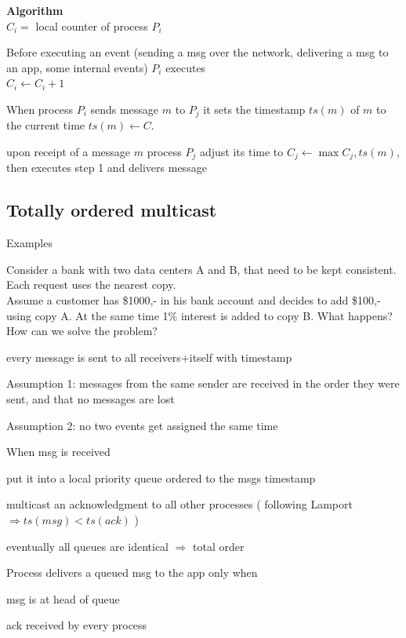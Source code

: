 \documentclass[ngerman,a4paper]{report}
\begin{document}
\textbf{Algorithm} \\
 $C_i =$ local counter of process $P_i$
 
\begin{compactenum}
\item Before executing an event (sending a msg over the network, delivering a msg to an app, some internal events) $P_i$ executes\\
$C_i \leftarrow C_i + 1$
\item When process $P_i$ sends message $m$ to $P_j$ it sets the timestamp $ts(m)$ of $m$ to the current time $ts(m) \leftarrow C$.
\item upon receipt of a message $m$ process $P_j$ adjust its time to $C_j \leftarrow \max{C_j, ts(m)}$, then executes step 1 and delivers message
\end{compactenum}

\subsection{Totally ordered multicast}
Examples
\begin{compactitem}
\item Consider a bank with two data centers A and B, that need to be kept consistent. Each request uses the nearest copy. \\
Assume a customer has \$1000,- in his bank account and decides to add \$100,- using copy A. At the same time 1\% interest is added to copy B. What happens? How can we solve the problem?



\begin{compactitem}
	\item  every message is sent to all receivers+itself with timestamp
	\item Assumption 1: messages from the same sender are received in the order they were sent, and that no messages are lost
	\item Assumption 2: no two events get assigned the same time
	\item When msg is received 
	\begin{compactenum}
		\item put it into a local priority queue ordered to the msgs timestamp
		\item multicast an acknowledgment to all other processes ( following Lamport $\Rightarrow ts(msg) < ts(ack)$ )
	\end{compactenum}
	
	\item eventually all queues are identical $\Rightarrow$ total order
	\item Process delivers a queued msg to the app only when
	\begin{compactenum}
		\item msg is at head of queue
		\item ack received by every process
	\end{compactenum}

\end{compactitem}

\end{compactitem}
\end{document}
